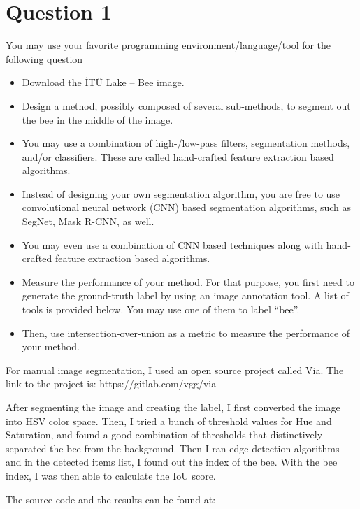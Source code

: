 \documentclass[12pt]{article}
\begin{document}
\maketitle

\section{Question 1}\label{sec:q1}
You may use your favorite programming environment/language/tool for the following question
\begin{itemize}
    \item Download the İTÜ Lake – Bee image.
    \item Design a method, possibly composed of several sub-methods, to segment out the bee in the middle of the image.
    \item You may use a combination of high-/low-pass filters, segmentation methods, and/or classifiers. These are called hand-crafted feature extraction based algorithms.
    \item Instead of designing your own segmentation algorithm, you are free to use convolutional neural network (CNN) based segmentation algorithms, such as SegNet, Mask R-CNN, as well. 
    \item You may even use a combination of CNN based techniques along with hand-crafted feature extraction based algorithms. 
    \item Measure the performance of your method. For that purpose, you first need to generate the ground-truth label by using an image annotation tool. A list of tools is provided below. You may use one of them to label “bee”.  
    \item Then, use intersection-over-union as a metric to measure the performance of your method.
\end{itemize}


For manual image segmentation, I used an open source project called Via. The link to the project is: https://gitlab.com/vgg/via

After segmenting the image and creating the label, I first converted the image into HSV color space. Then, I tried a bunch of threshold values for Hue and Saturation, and found a good combination of thresholds that distinctively separated the bee from the background. Then I ran edge detection algorithms and in the detected items list, I found out the index of the bee. With the bee index, I was then able to calculate the IoU score.

The source code and the results can be found at:
\end{document}
